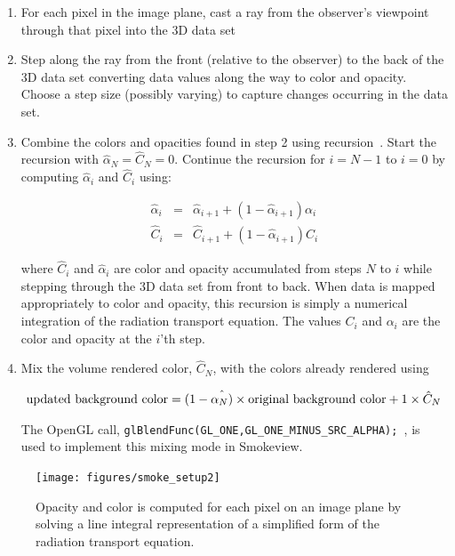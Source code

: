 \begin{enumerate}

\item For each pixel in the image plane, cast a ray from the observer's viewpoint through that pixel into the 3D data set

\item Step along the ray from the front (relative to the observer) to the back of the 3D data set converting data values along the way to color and opacity.  Choose a step size (possibly varying) to capture changes occurring in the data set.

\item
Combine the colors and opacities found in step 2 using recursion~\cite[Chapter 39]{gpugems}.
Start the recursion with $\hat{\alpha}_{N}=\hat{C}_{N}=0$. Continue the recursion for $i=N-1$ to $i=0$ by computing $\hat{\alpha}_i$ and $\hat{C}_i$ using:

\begin{eqnarray}
\label{eq:alphaupdate}
\hat{\alpha}_i&=&\hat{\alpha}_{i+1}+\left(1-\hat{\alpha}_{i+1}\right)\alpha_i\\
\label{eq:colorupdate}
\hat{C}_i&=&\hat{C}_{i+1}+\left(1-\hat{\alpha}_{i+1}\right)C_i
\end{eqnarray}

where $\hat{C}_i$ and $\hat{\alpha}_i$ are color and opacity accumulated from steps $N$ to $i$ while stepping through the 3D data set from front to back.  When data is mapped appropriately to color and opacity, this recursion is simply a numerical integration of the radiation transport equation.
The values $C_i$ and $\alpha_i$ are the color and opacity at the $i$'th step.  

\item Mix the volume rendered color, $\hat{C}_N$, with the colors already rendered using

\begin{eqnarray*}
\noindent\mbox{updated background color} = (1-\hat{\alpha_N)}\times \mbox{original background
color} + 1\times\hat{C}_N
\end{eqnarray*}

The OpenGL call, {\tt   glBlendFunc(GL\_ONE,GL\_ONE\_MINUS\_SRC\_ALPHA); }, is used to implement this mixing mode in Smokeview.
\end{enumerate}

\begin{figure}[\figoptions]
\begin{center}
\texttt{[image: figures/smoke\_setup2]}
\end{center}
\caption {Opacity and color is computed for each pixel on an image plane by solving a line integral
representation of a simplified form of the radiation transport equation.
}
\label{figsmokesetup2}
\end{figure}

